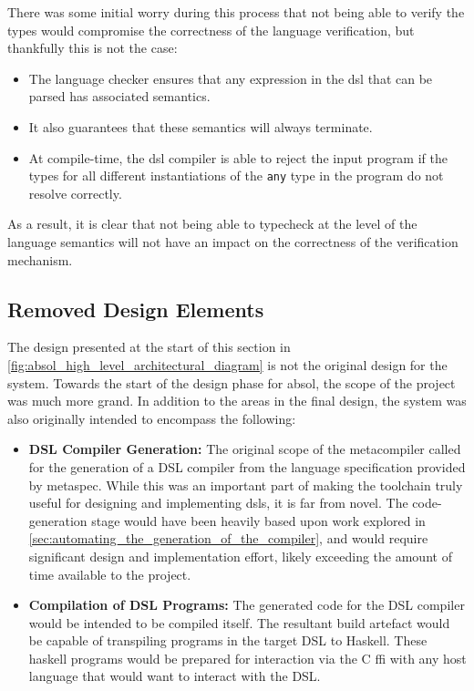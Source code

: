 There was some initial worry during this process that not being able to verify the types would compromise the correctness of the language verification, but thankfully this is not the case:
\begin{itemize}
    \item The language checker ensures that any expression in the \gls{dsl} that can be parsed has associated semantics.
    \item It also guarantees that these semantics will always terminate.
    \item At compile-time, the \gls{dsl} compiler is able to reject the input program if the types for all different instantiations of the \texttt{any} type in the program do not resolve correctly. 
\end{itemize}

As a result, it is clear that not being able to typecheck at the level of the language semantics will not have an impact on the correctness of the verification mechanism.


\subsection{Removed Design Elements} %
\label{sub:removed_design_elements}
The design presented at the start of this section in \autoref{fig:absol_high_level_architectural_diagram} is not the original design for the system.
Towards the start of the design phase for \gls{absol}, the scope of the project was much more grand. 
In addition to the areas in the final design, the system was also originally intended to encompass the following:
\begin{itemize}
    \item \textbf{DSL Compiler Generation:} The original scope of the metacompiler called for the generation of a DSL compiler from the language specification provided by \gls{metaspec}. 
    While this was an important part of making the toolchain truly useful for designing and implementing \glspl{dsl}, it is far from novel.
    The code-generation stage would have been heavily based upon work explored in \autoref{sec:automating_the_generation_of_the_compiler}, and would require significant design and implementation effort, likely exceeding the amount of time available to the project.
    \item \textbf{Compilation of DSL Programs:} The generated code for the DSL compiler would be intended to be compiled itself. 
    The resultant build artefact would be capable of transpiling programs in the target DSL to Haskell.
    These haskell programs would be prepared for interaction via the C \gls{ffi} with any host language that would want to interact with the DSL.
\end{itemize}


